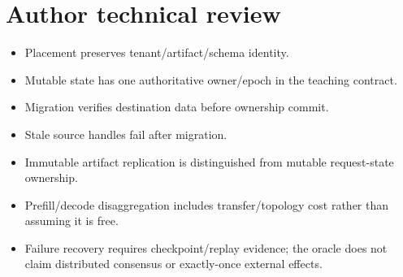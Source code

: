 \chapter*{Author technical review}
\begin{itemize}
\item Placement preserves tenant/artifact/schema identity.
\item Mutable state has one authoritative owner/epoch in the teaching contract.
\item Migration verifies destination data before ownership commit.
\item Stale source handles fail after migration.
\item Immutable artifact replication is distinguished from mutable request-state ownership.
\item Prefill/decode disaggregation includes transfer/topology cost rather than assuming it is free.
\item Failure recovery requires checkpoint/replay evidence; the oracle does not claim distributed consensus or exactly-once external effects.
\end{itemize}